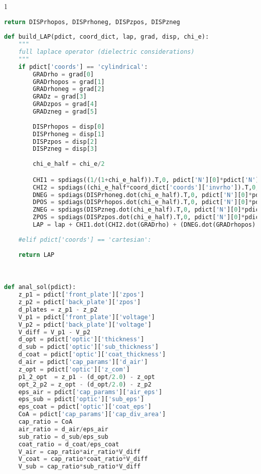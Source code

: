 \begin{spacing}{1}
\begin{lstlisting}[frame=single, language=Python]
    return DISPrhopos, DISPrhoneg, DISPzpos, DISPzneg
             
def build_LAP(pdict, coord_dict, lap, grad, disp, chi_e):
    """
    full laplace operator (dielectric considerations)
    """
    if pdict['coords'] == 'cylindrical':
        GRADrho = grad[0]
        GRADrhopos = grad[1]
        GRADrhoneg = grad[2]
        GRADz = grad[3]
        GRADzpos = grad[4]
        GRADzneg = grad[5]
        
        DISPrhopos = disp[0]
        DISPrhoneg = disp[1]
        DISPzpos = disp[2]
        DISPzneg = disp[3]
    
        chi_e_half = chi_e/2

        CHI1 = spdiags((1/(1+chi_e_half)).T,0, pdict['N'][0]*pdict['N'][1], pdict['N'][0]*pdict['N'][1], format='lil')
        CHI2 = spdiags((chi_e_half*coord_dict['coords']['invrho']).T,0, pdict['N'][0]*pdict['N'][1], pdict['N'][0]*pdict['N'][1], format='lil')
        DNEG = spdiags(DISPrhoneg.dot(chi_e_half).T,0, pdict['N'][0]*pdict['N'][1], pdict['N'][0]*pdict['N'][1], format='lil')
        DPOS = spdiags(DISPrhopos.dot(chi_e_half).T,0, pdict['N'][0]*pdict['N'][1], pdict['N'][0]*pdict['N'][1], format='lil')
        ZNEG = spdiags(DISPzneg.dot(chi_e_half).T,0, pdict['N'][0]*pdict['N'][1], pdict['N'][0]*pdict['N'][1], format='lil')
        ZPOS = spdiags(DISPzpos.dot(chi_e_half).T,0, pdict['N'][0]*pdict['N'][1], pdict['N'][0]*pdict['N'][1], format='lil')
        LAP = lap + CHI1.dot(CHI2.dot(GRADrho) + (DNEG.dot(GRADrhopos) - DPOS.dot(GRADrhoneg))/pdict['res'][0] + (ZNEG.dot(GRADzpos) - ZPOS.dot(GRADzneg))/pdict['res'][1]) 
        
    #elif pdict['coords'] == 'cartesian':
        
    return LAP



def anal_sol(pdict):
    z_p1 = pdict['front_plate']['zpos']
    z_p2 = pdict['back_plate']['zpos']
    d_plates = z_p1 - z_p2
    V_p1 = pdict['front_plate']['voltage']
    V_p2 = pdict['back_plate']['voltage']
    V_diff = V_p1 - V_p2
    d_opt = pdict['optic']['thickness']
    d_sub = pdict['optic']['sub_thickness']
    d_coat = pdict['optic']['coat_thickness']
    d_air = pdict['cap_params']['d_air']
    z_opt = pdict['optic']['z_com']
    p1_2_opt  = z_p1 - (d_opt/2.0) - z_opt
    opt_2_p2 = z_opt - (d_opt/2.0) - z_p2
    eps_air = pdict['cap_params']['air_eps']
    eps_sub = pdict['optic']['sub_eps']   
    eps_coat = pdict['optic']['coat_eps']
    CoA = pdict['cap_params']['cap_div_area']
    cap_ratio = CoA
    air_ratio = d_air/eps_air
    sub_ratio = d_sub/eps_sub
    coat_ratio = d_coat/eps_coat
    V_air = cap_ratio*air_ratio*V_diff
    V_coat = cap_ratio*coat_ratio*V_diff
    V_sub = cap_ratio*sub_ratio*V_diff
    


\end{lstlisting}
\end{spacing}
